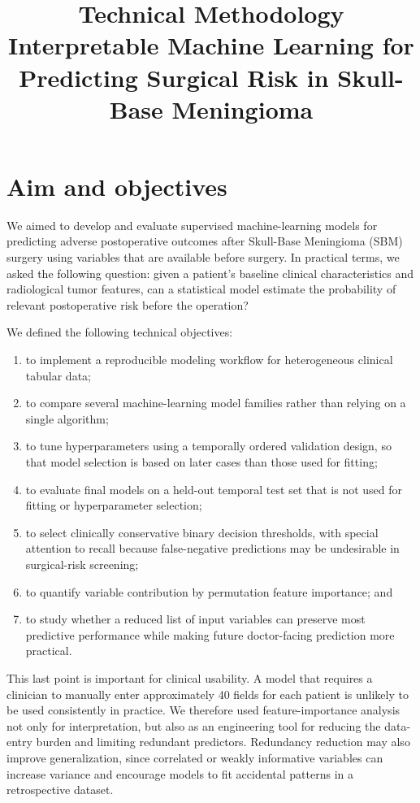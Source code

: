 \documentclass[11pt,a4paper]{article}
\title{Technical Methodology\\
\large Interpretable Machine Learning for Predicting Surgical Risk in Skull-Base Meningioma}
\date{}
\begin{document}
\maketitle

\section{Aim and objectives}

We aimed to develop and evaluate supervised machine-learning models for predicting adverse postoperative outcomes after Skull-Base Meningioma (SBM) surgery using variables that are available before surgery. In practical terms, we asked the following question: given a patient's baseline clinical characteristics and radiological tumor features, can a statistical model estimate the probability of relevant postoperative risk before the operation?

We defined the following technical objectives:

\begin{enumerate}
    \item to implement a reproducible modeling workflow for heterogeneous clinical tabular data;
    \item to compare several machine-learning model families rather than relying on a single algorithm;
    \item to tune hyperparameters using a temporally ordered validation design, so that model selection is based on later cases than those used for fitting;
    \item to evaluate final models on a held-out temporal test set that is not used for fitting or hyperparameter selection;
    \item to select clinically conservative binary decision thresholds, with special attention to recall because false-negative predictions may be undesirable in surgical-risk screening;
    \item to quantify variable contribution by permutation feature importance; and
    \item to study whether a reduced list of input variables can preserve most predictive performance while making future doctor-facing prediction more practical.
\end{enumerate}

This last point is important for clinical usability. A model that requires a clinician to manually enter approximately 40 fields for each patient is unlikely to be used consistently in practice. We therefore used feature-importance analysis not only for interpretation, but also as an engineering tool for reducing the data-entry burden and limiting redundant predictors. Redundancy reduction may also improve generalization, since correlated or weakly informative variables can increase variance and encourage models to fit accidental patterns in a retrospective dataset.
\end{document}
